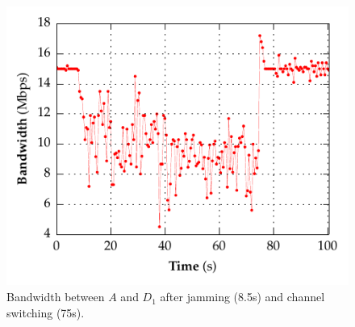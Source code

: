 \begin{figure}[t!]
  \centering
  \includegraphics[width=0.8\columnwidth]{./figures/ChannelBWGraph.pdf}
  \vspace*{-0.1in}
  \caption{Bandwidth between $A$ and $D_1$ after jamming (8.5s) and
  channel switching (75s).}
  \label{fig:bw}
  \vspace*{-0.1in}
\end{figure}
